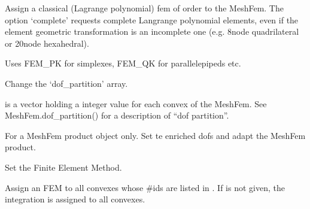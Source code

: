 \documentclass[a4paper,11pt,english]{sphinxmanual}
\begin{document}
\begin{fulllineitems}
\begin{fulllineitems}
Assign a classical (Lagrange polynomial) fem of order  to the MeshFem.
The option ‘complete’ requests complete Langrange polynomial elements,
even if the element geometric transformation is an incomplete one
(e.g. 8\sphinxhyphen{}node quadrilateral or 20\sphinxhyphen{}node hexahedral).

Uses FEM\_PK for simplexes, FEM\_QK for parallelepipeds etc.

\end{fulllineitems}


\begin{fulllineitems}
\label{\detokenize{python/cmdref_MeshFem:getfem.MeshFem.set_dof_partition}}
Change the ‘dof\_partition’ array.

 is a vector holding a integer value for each convex of the MeshFem.
See MeshFem.dof\_partition() for a description of “dof partition”.

\end{fulllineitems}


\begin{fulllineitems}
\label{\detokenize{python/cmdref_MeshFem:getfem.MeshFem.set_enriched_dofs}}
For a MeshFem product object only. Set te enriched dofs and adapt the MeshFem product.

\end{fulllineitems}


\begin{fulllineitems}
\label{\detokenize{python/cmdref_MeshFem:getfem.MeshFem.set_fem}}
Set the Finite Element Method.

Assign an FEM  to all convexes whose \#ids are listed in .
If  is not given, the integration is assigned to all convexes.


\end{fulllineitems}
\end{fulllineitems}
\end{document}
